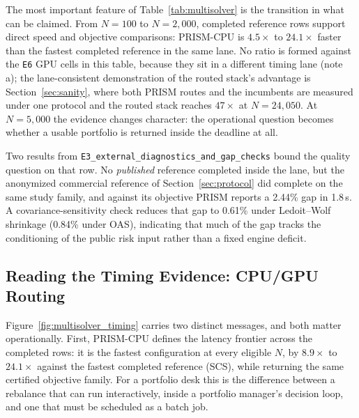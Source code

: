 \documentclass[10pt,a4paper]{extarticle}
\begin{document}
The most important feature of Table~\ref{tab:multisolver} is the transition in
what can be claimed. From $N{=}100$ to $N{=}2{,}000$, completed reference rows
support direct speed and objective comparisons: PRISM-CPU is $4.5\times$ to
$24.1\times$ faster than the fastest completed reference in the same lane.
No ratio is formed against the \texttt{E6} GPU cells in this table, because
they sit in a different timing lane (note a); the lane-consistent
demonstration of the routed stack's advantage is
Section~\ref{sec:sanity}, where both PRISM routes and the incumbents are
measured under one protocol and the routed stack reaches $47\times$ at
$N{=}24{,}050$. At $N{=}5{,}000$ the evidence changes character: the
operational question becomes whether a usable portfolio is returned inside
the deadline at all.

Two results from \texttt{E3\_external\_diagnostics\_and\_gap\_checks} bound
the quality question on that row. No \emph{published} reference completed
inside the lane, but the anonymized commercial reference of
Section~\ref{sec:protocol} did complete on the same study family, and
against its objective PRISM reports a 2.44\% gap in 1.8\,s. A
covariance-sensitivity check reduces that gap to 0.61\% under Ledoit--Wolf
shrinkage (0.84\% under OAS), indicating that much of the gap tracks the
conditioning of the public risk input rather than a fixed engine deficit.

\subsection{Reading the Timing Evidence: CPU/GPU Routing}

Figure~\ref{fig:multisolver_timing} carries two distinct messages, and both
matter operationally. First, PRISM-CPU defines the latency frontier across the
completed rows: it is the fastest configuration at every eligible $N$, by
$8.9\times$ to $24.1\times$ against the fastest completed reference (SCS),
while returning the same certified objective family. For a portfolio desk this
is the difference between a rebalance that can run interactively, inside a
portfolio manager's decision loop, and one that must be scheduled as a batch
job.
\end{document}
